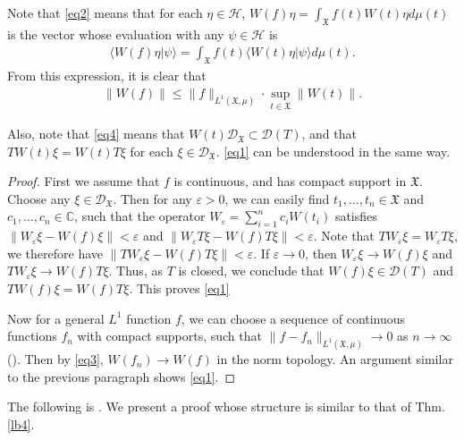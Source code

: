\documentclass[12pt,a4paper,notitlepage]{article}
\theoremstyle{definition}
\theoremstyle{plain}
\newcommand{\fk}{\mathfrak}
\newcommand{\mc}{\mathcal}
\newcommand{\Dom}{\scr D}
\newcommand{\bk}[1]{\langle {#1}\rangle}
\newcommand{\scr}{\mathscr}
\numberwithin{equation}{subsection}
\begin{document}
Note that \eqref{eq2} means that for each $\eta\in\mc H$, $W(f)\eta=\int_{\fk X}f(t)W(t)\eta d\mu(t)$ is the vector whose evaluation with any $\psi\in\mc H$ is 
\begin{align*}
\bk{W(f)\eta|\psi}=\int_{\fk X}f(t)\bk{W(t)\eta|\psi}d\mu(t).
\end{align*}
From this expression, it is clear that
\begin{align}
\lVert W(f)\lVert\leq \lVert f\lVert_{L^1(\fk X,\mu)}\cdot \sup_{t\in\fk X}\lVert W(t)\lVert.\label{eq3}	
\end{align}

Also, note that \eqref{eq4} means that $W(t)\Dom_{\fk X}\subset\Dom(T)$, and that $TW(t)\xi=W(t)T\xi$ for each $\xi\in\Dom_{\fk X}$. \eqref{eq1} can be understood in the same way.


\begin{proof}
First we assume that $f$ is continuous, and has compact support in $\mathfrak X$. Choose any $\xi\in\Dom_{\fk X}$. Then for any $\varepsilon>0$, we can easily find $t_1,\dots,t_n\in\mathfrak X$ and $c_1,\dots,c_n\in\mathbb C$, such that the operator $W_\varepsilon=\sum_{i=1}^nc_iW(t_i)$ satisfies $\lVert W_\varepsilon\xi-W(f)\xi\lVert<\varepsilon$ and $\lVert W_\varepsilon T\xi-W(f)T\xi\lVert<\varepsilon$. Note that $TW_\varepsilon\xi=W_\varepsilon T\xi$, we therefore have $\lVert TW_\varepsilon\xi-W(f)T\xi\lVert<\varepsilon$. If $\varepsilon\rightarrow 0$, then $W_\varepsilon\xi\rightarrow W(f)\xi$ and $TW_\varepsilon \xi\rightarrow W(f)T\xi$. Thus, as $T$ is closed, we conclude that $W(f)\xi\in\Dom(T)$ and $TW(f)\xi=W(f)T\xi$. This proves \eqref{eq1}	
	
Now for a general $L^1$ function $f$, we can choose a sequence of continuous functions $f_n$ with compact supports, such that $\lVert f-f_n\lVert_{L^1(\fk X,\mu)}\rightarrow 0$ as $n\rightarrow \infty$ (\cite[Thm. 3.14]{Rud-R}). Then by \eqref{eq3}, $W(f_n)\rightarrow W(f)$ in the norm topology. An argument similar to the previous paragraph shows \eqref{eq1}.
\end{proof}









The following is \cite[Lemma 7.2]{CKLW18}. We present a proof whose  structure is similar to that of Thm. \ref{lb4}.
\end{document}
